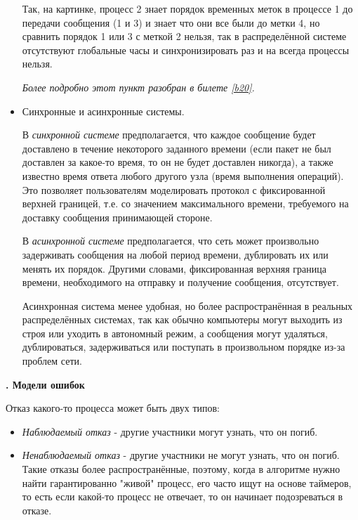 \begin{itemize}
Так, на картинке, процесс 2 знает порядок временных меток в процессе 1 до передачи сообщения (1 и 3) и знает что они все были до метки 4, но сравнить порядок 1 или 3 с меткой 2 нельзя, так в распределённой системе отсутствуют глобальные часы и синхронизировать раз и на всегда процессы нельзя.
 
\textit{Более подробно этот пункт разобран в билете \ref{b20}.}
 
\item  Синхронные и асинхронные системы.

\hspace{12px}В \textit{синхронной системе} предполагается, что каждое сообщение будет доставлено в течение некоторого заданного времени (если пакет не был доставлен за какое-то время, то он не будет доставлен никогда), а также известно время ответа любого другого узла (время выполнения операций).
Это позволяет пользователям моделировать протокол с фиксированной верхней границей, т.е. со значением максимального времени, требуемого на доставку сообщения принимающей стороне.

\hspace{12px}В \textit{асинхронной системе} предполагается, что сеть может произвольно задерживать сообщения на любой период времени, дублировать их или менять их порядок. Другими словами, фиксированная верхняя граница времени, необходимого на отправку и получение сообщения, отсутствует.

\hspace{12px} Асинхронная система менее удобная, но более распространённая в реальных распределённых системах, так как обычно компьютеры могут выходить из строя или уходить в автономный режим, а сообщения могут удаляться, дублироваться, задерживаться или поступать в произвольном порядке из-за проблем сети.
\end{itemize} 
\textbf{. Модели ошибок}

Отказ какого-то процесса может быть двух типов:
\begin{itemize}
\setlength\itemsep{0.0001em}
\item \textit{Наблюдаемый отказ}  -  другие участники могут узнать, что он погиб.
\item \textit{Ненаблюдаемый отказ}  - другие участники не могут узнать, что он погиб. Такие отказы более распространённые, поэтому, когда в алгоритме нужно найти гарантированно "живой" процесс, его часто ищут на основе таймеров, то есть если какой-то процесс не отвечает, то он начинает подозреваться в отказе.
\end{itemize}

